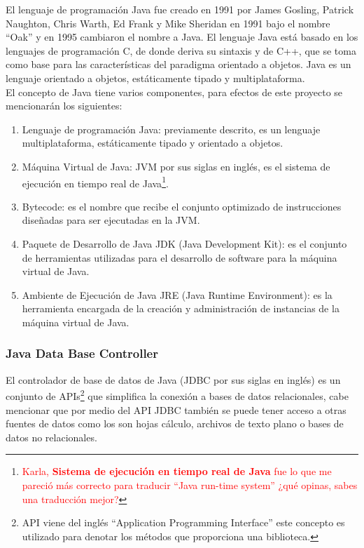 El lenguaje de programación Java fue creado en 1991 por James Gosling, Patrick Naughton, Chris Warth, Ed Frank y Mike Sheridan en 1991 bajo el nombre ``Oak'' y en 1995 cambiaron el nombre a Java. El lenguaje Java está basado en los lenguajes de programación C, de donde deriva su sintaxis y de C++, que se toma como base para las características del paradigma orientado a objetos. Java es un lenguaje orientado a objetos, estáticamente tipado y multiplataforma\cite{JavaCompleteReference, WellGroundedJavaDeveloper}.\\
El concepto de Java tiene varios componentes, para efectos de este proyecto se mencionarán los siguientes\cite{JavaCompleteReference, WellGroundedJavaDeveloper}:
\begin{enumerate}
	\item Lenguaje de programación Java: previamente descrito, es un lenguaje multiplataforma, estáticamente tipado y orientado a objetos.
	\item Máquina Virtual de Java: JVM por sus siglas en inglés, es el sistema de ejecución en tiempo real de Java\footnote{\textcolor{red}{Karla, \textbf{Sistema de ejecución en tiempo real de Java} fue lo que me pareció más correcto para traducir ``Java run-time system'' ¿qué opinas, sabes una traducción mejor?}}.
	\item Bytecode: es el nombre que recibe el conjunto optimizado de instrucciones diseñadas para ser ejecutadas en la JVM.
	\item Paquete de Desarrollo de Java JDK (Java Development Kit): es el conjunto de herramientas utilizadas para el desarrollo de software para la máquina virtual de Java.
	\item Ambiente de Ejecución de Java JRE (Java Runtime Environment): es la herramienta encargada de la creación y administración de instancias de la máquina virtual de Java.
\end{enumerate}

\subsubsection{Java Data Base Controller}\label{sec:jdbc}
El controlador de base de datos de Java (JDBC por sus siglas en inglés) es un conjunto de APIs\footnote{API viene del inglés ``Application Programming Interface'' este concepto es utilizado para denotar los métodos que proporciona una biblioteca.} que simplifica la conexión a bases de datos relacionales, cabe mencionar que por medio del API JDBC también se puede tener acceso a otras fuentes de datos como los son hojas cálculo, archivos de texto plano o bases de datos no relacionales\cite{JDBCRecipes, BeginingJava8APIs}.

